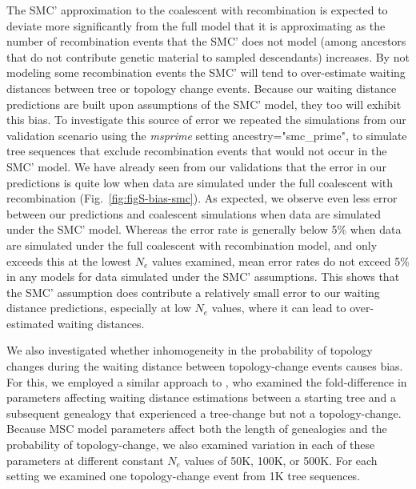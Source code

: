 \documentclass[11pt]{article}
\begin{document}
The SMC' approximation to the coalescent with recombination is expected 
to deviate more significantly from the full model that it is approximating 
as the number of recombination events that the SMC' does not model 
(among ancestors that do not contribute genetic material to sampled descendants) 
increases. 
By not modeling some recombination events the SMC' will tend to 
over-estimate waiting distances between tree or topology change events. 
Because our waiting distance predictions are built upon assumptions of 
the SMC' model, they too will exhibit this bias. 
To investigate this source of error we repeated the simulations from our 
validation scenario using the \emph{msprime} setting ancestry="smc\_prime",
to simulate tree sequences that exclude recombination events that would 
not occur in the SMC' model. 
We have already seen from our validations that the error in our predictions 
is quite low when data are simulated under the full coalescent with 
recombination (Fig.~\ref{fig:figS-bias-smc}).
As expected, we observe even less error 
between our predictions and coalescent simulations when data are simulated
under the SMC' model. Whereas the error 
rate is generally below 5\% when data are simulated under the full coalescent
with recombination model, and only exceeds this at the lowest
$N_e$ values examined, mean error rates do not exceed 5\% in any 
models for data simulated under the SMC' assumptions. 
This shows that the SMC' assumption does contribute a relatively small error 
to our waiting distance predictions, especially at low $N_e$ values,
where it can lead to over-estimated waiting distances.

We also investigated whether inhomogeneity in the probability of topology 
changes during the waiting distance between topology-change events 
causes bias. 
For this, we employed a similar approach to \citet{deng_distribution_2021}, 
who examined the fold-difference in parameters affecting waiting distance
estimations between a starting tree and a subsequent genealogy that 
experienced a tree-change but not a topology-change. 
Because MSC model parameters affect both the length of genealogies and
the probability of topology-change, we also examined variation in each of these 
parameters at different constant $N_e$ values of 50K, 100K, or 500K. 
For each setting we examined one topology-change event from 1K tree sequences. 
\end{document}

